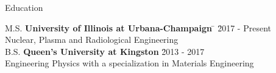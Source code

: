 \documentclass{resume2} %
\begin{document}

\begin{rSection}{Education}
	
\begin{tabbing}
M.S. \hspace*{2 em}\= \textbf{University of Illinois at Urbana-Champaign} \hspace*{5em} \= \hspace*{6em} \= 2017 - Present \\
\> Nuclear, Plasma and Radiological Engineering \\
%
B.S. \hspace*{2 em}\> \textbf{Queen's University at Kingston} \> \hspace*{7.2em} \= 2013 - 2017 \\
\> Engineering Physics with a specialization in Materials Engineering
\end{tabbing}

\end{rSection}

\end{document}
